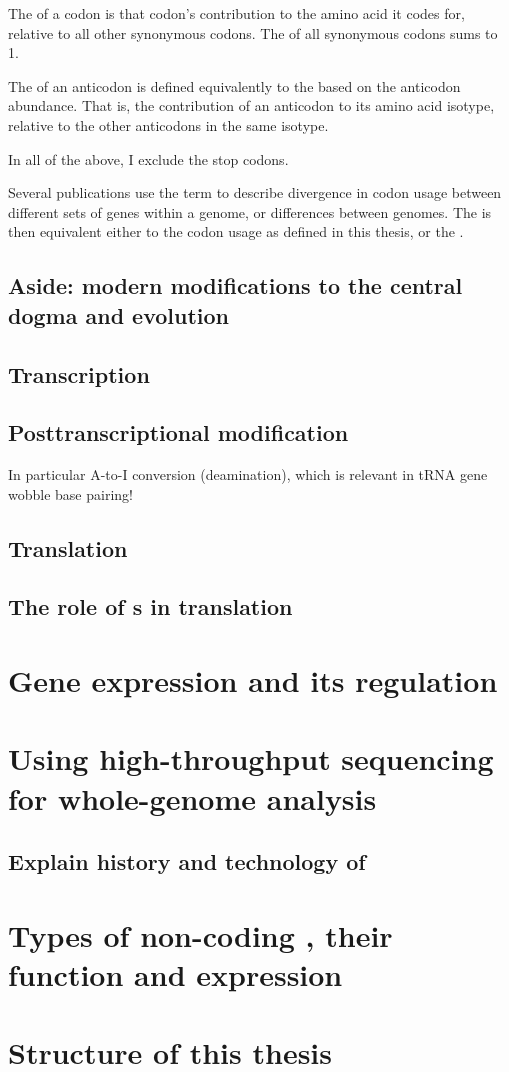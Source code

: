The  of a codon is that codon’s contribution to the amino acid it
codes for, relative to all other synonymous codons. The \rcu of all synonymous
codons sums to \num{1}.

The  of an anticodon is defined equivalently to the \rcu based on
the anticodon abundance. That is, the contribution of an anticodon to its amino
acid isotype, relative to the other anticodons in the same isotype.

In all of the above, I exclude the stop codons.

Several publications use the term \cub to describe divergence in codon usage
between different sets of genes within a genome, or differences between genomes.
The \cub is then equivalent either to the codon usage as defined in this thesis,
or the \rcu.

\subsection{Aside: modern modifications to the central dogma and evolution}

\subsection{Transcription}

\subsection{Posttranscriptional modification}

In particular A-to-I conversion (deamination), which is relevant in tRNA gene
wobble base pairing!

\subsection{Translation}

\subsection{The role of s in translation}

\section{Gene expression and its regulation}

\section{Using high-throughput sequencing for whole-genome analysis}

\subsection{Explain history and technology of }

\section{Types of non-coding , their function and expression}

\section{Structure of this thesis}
